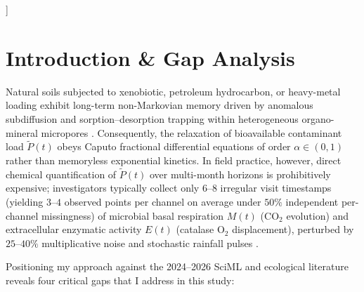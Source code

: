 \documentclass[10pt,twocolumn,a4paper]{article}
\begin{document}
\begin{@twocolumnfalse}
\begin{abstract}
mid-trajectory drop detector, and expanded $N_{\text{train}}=4{,}500$ simulator resolve chronic-regime false negatives on $>60$-year aged oil (\texttt{Garousin 2021}: $3/3$ seeds, $d_{\min}=0.665$) while maintaining $0/3$ false alarms on real external clean controls (\texttt{CWS}, \texttt{CFS}, Chernozem) and improving validation Youden's $J$ ($0.8098 \to 0.8375$).
      \vspace*{2mm}
      
      \noindent\textbf{Keywords:} Kolmogorov-Arnold Networks; Fractional Calculus; Mittag-Leffler Function; Pad\'e Approximant; Amortized Simulation-Based Inference; Soil Bioindication; Haldane Kinetics.
    \end{abstract}
    \vspace*{4mm}
  \end{@twocolumnfalse}
]

\section{Introduction \& Gap Analysis}

Natural soils subjected to xenobiotic, petroleum hydrocarbon, or heavy-metal loading exhibit long-term non-Markovian memory driven by anomalous subdiffusion and sorption--desorption trapping within heterogeneous organo-mineral micropores \cite{schumer2003}. Consequently, the relaxation of bioavailable contaminant load $\tilde{P}(t)$ obeys Caputo fractional differential equations of order $\alpha \in (0, 1)$ rather than memoryless exponential kinetics. In field practice, however, direct chemical quantification of $\tilde{P}(t)$ over multi-month horizons is prohibitively expensive; investigators typically collect only $6\text{--}8$ irregular visit timestamps (yielding $3\text{--}4$ observed points per channel on average under $50\%$ independent per-channel missingness) of microbial basal respiration $M(t)$ ($\text{CO}_2$ evolution) and extracellular enzymatic activity $E(t)$ (catalase $\text{O}_2$ displacement), perturbed by $25\text{--}40\%$ multiplicative noise and stochastic rainfall pulses \cite{kolesnikov2021ag,mdpienzymes2024,mdpi2024oxidoreductases}.

Positioning my approach against the 2024--2026 SciML and ecological literature reveals four critical gaps that I address in this study:
\end{document}
